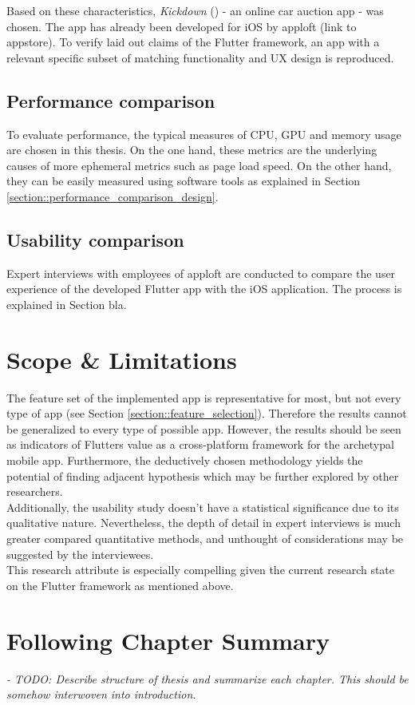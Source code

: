 Based on these characteristics, \textit{Kickdown} (\cite{Kickdown2021}) - an online car auction app - was chosen. 
The app has already been developed for iOS by apploft (link to appstore).
To verify laid out claims of the Flutter framework, an app with a relevant specific subset of matching functionality
and UX design is reproduced.

\subsection{Performance comparison}
To evaluate performance, the typical measures of CPU, GPU and memory usage are chosen in this thesis. 
On the one hand, these metrics are the underlying causes of more ephemeral metrics such as page load speed. 
On the other hand, they can be easily measured using software tools as explained in Section \ref{section::performance_comparison_design}.

\subsection{Usability comparison}
Expert interviews with employees of apploft are conducted to compare the user experience of the developed Flutter app with the iOS application.
The process is explained in Section bla.

\section{Scope \& Limitations}
The feature set of the implemented app is representative for most, but not every type of app (see Section \ref{section::feature_selection}). 
Therefore the results cannot be generalized to every type of possible app. 
However, the results should be seen as indicators of Flutters value as a cross-platform framework for the 
archetypal mobile app. 
Furthermore, the deductively chosen methodology yields the potential of finding adjacent hypothesis which may be
further explored by other researchers.\\
Additionally, the usability study doesn't have a statistical significance due to its qualitative nature. Nevertheless, the depth of detail
in expert interviews is much greater compared quantitative methods, and unthought of considerations may be suggested by the interviewees.\\
This research attribute is especially compelling given the current research state on the Flutter framework as mentioned above. 

\section{Following Chapter Summary}
\textit{- TODO: Describe structure of thesis and summarize each chapter. 
This should be somehow interwoven into introduction.}